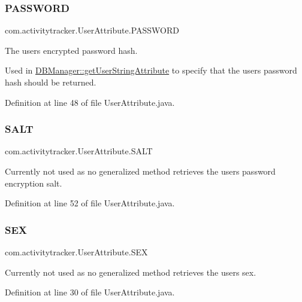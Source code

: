 \subsubsection{\texorpdfstring{PASSWORD}{PASSWORD}}
{\footnotesize\ttfamily com.\+activitytracker.\+User\+Attribute.\+P\+A\+S\+S\+W\+O\+RD}

The user\textquotesingle{}s encrypted password hash.

Used in \mbox{\hyperlink{classcom_1_1activitytracker_1_1_d_b_manager_a20f726c054d6c8a6fc3ce629d87f1114}{D\+B\+Manager\+::get\+User\+String\+Attribute}} to specify that the user\textquotesingle{}s password hash should be returned. 

Definition at line 48 of file User\+Attribute.\+java.

\mbox{\label{enumcom_1_1activitytracker_1_1_user_attribute_acd286be9d131a84a2be02e1cdac4c848}} 
\subsubsection{\texorpdfstring{SALT}{SALT}}
{\footnotesize\ttfamily com.\+activitytracker.\+User\+Attribute.\+S\+A\+LT}

Currently not used as no generalized method retrieves the user\textquotesingle{}s password encryption salt. 

Definition at line 52 of file User\+Attribute.\+java.

\mbox{\label{enumcom_1_1activitytracker_1_1_user_attribute_a53fe928fb805b69c606a351aac257558}} 
\subsubsection{\texorpdfstring{SEX}{SEX}}
{\footnotesize\ttfamily com.\+activitytracker.\+User\+Attribute.\+S\+EX}

Currently not used as no generalized method retrieves the user\textquotesingle{}s sex. 

Definition at line 30 of file User\+Attribute.\+java.


